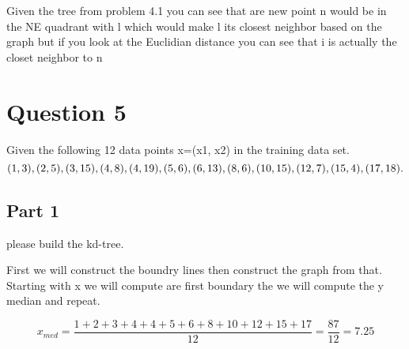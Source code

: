 \documentclass{report}
\begin{document}
Given the tree from problem 4.1 you can see that are new point n would be in the NE quadrant with l which would make l its closest neighbor based on the graph but if you look at the Euclidian distance you can see that i is actually the closet neighbor to n 

\chapter{Question 5}

Given the following 12 data points x=(x1,	x2)	in	the	training	data	set.
\begin{equation*}
  (1,	3),	(2,	5),	(3,	15),	(4,	8),	(4,	19),	(5,	6),	(6,	13), \\
(8,	6),	(10,	15),	(12,	7),	(15,	4),	(17,	18).
\end{equation*}

\section{Part 1}
please	build	the	kd-tree.


  First we will construct the boundry lines then construct the graph from that.
Starting with x we will compute are first boundary the we will compute the y median and repeat. 

\begin{equation*}
  x_{med} = \frac{1+2+3+4+4+5+6+8+10+12+15+17}{12}=\frac{87}{12} = 7.25
\end{equation*}

\end{document}
